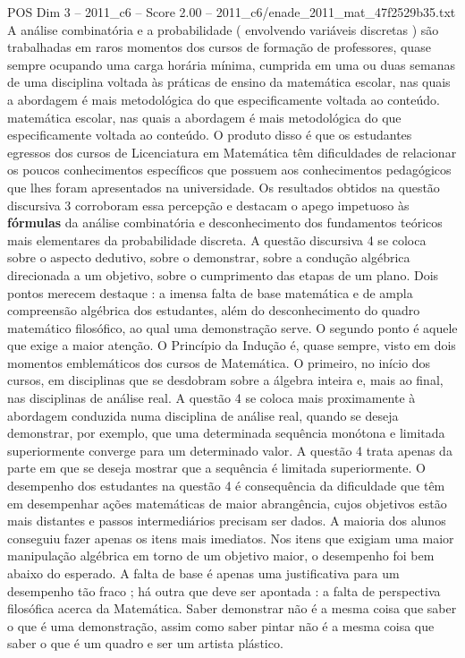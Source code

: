\begin{textsample}{POS Dim 3 – 2011\_c6 – Score 2.00 – 2011\_c6/enade\_2011\_mat\_47f2529b35.txt}
A análise combinatória e a probabilidade ( envolvendo variáveis discretas ) são trabalhadas em raros momentos dos cursos de formação de professores, quase sempre ocupando uma carga horária mínima, cumprida em uma ou duas semanas de uma disciplina voltada às práticas de ensino da matemática escolar, nas quais a abordagem é mais metodológica do que especificamente voltada ao conteúdo. matemática escolar, nas quais a abordagem é mais metodológica do que especificamente voltada ao conteúdo.
O produto disso é que os estudantes egressos dos cursos de Licenciatura em Matemática têm dificuldades de relacionar os poucos conhecimentos específicos que possuem aos conhecimentos pedagógicos que lhes foram apresentados na universidade.
Os resultados obtidos na questão discursiva 3 corroboram essa percepção e destacam o apego impetuoso às \textbf{fórmulas} da análise combinatória e desconhecimento dos fundamentos teóricos mais elementares da probabilidade discreta.
A questão discursiva 4 se coloca sobre o aspecto dedutivo, sobre o demonstrar, sobre a condução algébrica direcionada a um objetivo, sobre o cumprimento das etapas de um plano.
Dois pontos merecem destaque : a imensa falta de base matemática e de ampla compreensão algébrica dos estudantes, além do desconhecimento do quadro matemático filosófico, ao qual uma demonstração serve.
O segundo ponto é aquele que exige a maior atenção.
O Princípio da Indução é, quase sempre, visto em dois momentos emblemáticos dos cursos de Matemática.
O primeiro, no início dos cursos, em disciplinas que se desdobram sobre a álgebra inteira e, mais ao final, nas disciplinas de análise real.
A questão 4 se coloca mais proximamente à abordagem conduzida numa disciplina de análise real, quando se deseja demonstrar, por exemplo, que uma determinada sequência monótona e limitada superiormente converge para um determinado valor.
A questão 4 trata apenas da parte em que se deseja mostrar que a sequência é limitada superiormente.
O desempenho dos estudantes na questão 4 é consequência da dificuldade que têm em desempenhar ações matemáticas de maior abrangência, cujos objetivos estão mais distantes e passos intermediários precisam ser dados.
A maioria dos alunos conseguiu fazer apenas os itens mais imediatos.
Nos itens que exigiam uma maior manipulação algébrica em torno de um objetivo maior, o desempenho foi bem abaixo do esperado.
A falta de base é apenas uma justificativa para um desempenho tão fraco ; há outra que deve ser apontada : a falta de perspectiva filosófica acerca da Matemática.
Saber demonstrar não é a mesma coisa que saber o que é uma demonstração, assim como saber pintar não é a mesma coisa que saber o que é um quadro e ser um artista plástico.

\end{textsample}
